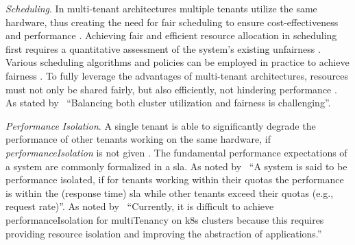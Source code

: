 \documentclass[11pt, a4paper, oneside, listof=totoc]{scrartcl}
\begin{document}
\begin{enumerate}[label={[\arabic*]:},
                    ref=Challenge~\arabic*,
                    leftmargin=*,
                    itemsep=0.6\baselineskip]
                    \item\label{chal:scheduling}
                        \textit{Scheduling}.
                        In multi-tenant architectures multiple tenants utilize the same hardware,
                        thus creating the need for fair scheduling to ensure cost-effectiveness
                        and performance \parencite[p.~32597]{simi2024}.
                        Achieving fair and efficient resource allocation in scheduling first
                        requires a quantitative assessment of the system's existing unfairness
                        \parencites[p.~7]{ebrahimi2012}[p.~14]{beltre2019}[pp.~2--3]{ghodsi2011}.
                        Various scheduling algorithms and policies can be employed in practice to
                        achieve fairness \parencites[pp.~14--16]{beltre2019}[p.~4]{ghodsi2011}.
                        To fully leverage the advantages of multi-tenant architectures, resources
                        must not only be shared fairly, but also efficiently, not hindering
                        performance \parencite[p.~14]{beltre2019}.
                        As stated by~\cite[p.~14]{beltre2019} \enquote{Balancing both cluster
                        utilization and fairness is challenging}.
                    
                    \item\label{chal:isolation}
                        \textit{Performance Isolation}.
                        A single tenant is able to significantly degrade the performance of other
                        tenants working on the same hardware, if \textit{\gls{performanceIsolation}}
                        is not given \parencite[p.~195]{krebs2013}.
                        The fundamental performance expectations of a system are commonly formalized
                        in a \acrfull{sla}.%
                        As noted by~\cite[p.~195]{krebs2013} \enquote{A system is said to be
                        performance isolated, if for tenants working within their quotas the
                        performance is within the (response time) \gls{sla} while other
                        tenants exceed their quotas (e.g., request rate)}.
                        As noted by~\cite[p.~18]{carrion2022} \enquote{Currently, it is difficult
                        to achieve \gls{performanceIsolation} for \gls{multiTenancy} on \gls{k8s}
                        clusters because this requires providing resource isolation and improving
                        the abstraction of applications.}


\end{enumerate}
\end{document}
